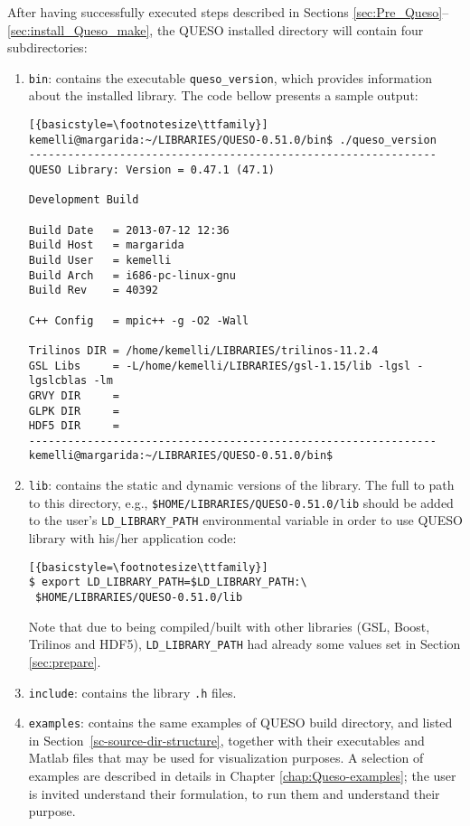 After having successfully executed steps described in Sections \ref{sec:Pre_Queso}--\ref{sec:install_Queso_make}, the QUESO installed directory will contain four subdirectories:
\begin{enumerate}
 \item \verb+bin+: contains the executable \verb+queso_version+, which provides information about the installed library. The code bellow presents a sample output:

\begin{lstlisting}[{basicstyle=\footnotesize\ttfamily}]
kemelli@margarida:~/LIBRARIES/QUESO-0.51.0/bin$ ./queso_version 
---------------------------------------------------------------
QUESO Library: Version = 0.47.1 (47.1)

Development Build

Build Date   = 2013-07-12 12:36
Build Host   = margarida
Build User   = kemelli
Build Arch   = i686-pc-linux-gnu
Build Rev    = 40392

C++ Config   = mpic++ -g -O2 -Wall

Trilinos DIR = /home/kemelli/LIBRARIES/trilinos-11.2.4
GSL Libs     = -L/home/kemelli/LIBRARIES/gsl-1.15/lib -lgsl -lgslcblas -lm
GRVY DIR     = 
GLPK DIR     = 
HDF5 DIR     = 
---------------------------------------------------------------
kemelli@margarida:~/LIBRARIES/QUESO-0.51.0/bin$ 
\end{lstlisting}

 \item \verb+lib+: contains the static and dynamic versions of the library. The full to path to this directory, e.g., \verb+$HOME/LIBRARIES/QUESO-0.51.0/lib+ should be added to the user's \verb+LD_LIBRARY_PATH+ environmental variable in order to use QUESO library with his/her application code:
\begin{lstlisting}[{basicstyle=\footnotesize\ttfamily}]
$ export LD_LIBRARY_PATH=$LD_LIBRARY_PATH:\
 $HOME/LIBRARIES/QUESO-0.51.0/lib
\end{lstlisting}


Note that due to \Queso{} being compiled/built with other libraries (GSL, Boost, Trilinos and HDF5), \verb+LD_LIBRARY_PATH+ had already some values set in Section \ref{sec:prepare}.


 \item \verb+include+: contains the library \verb+.h+ files.

 \item \verb+examples+: contains the same examples of QUESO build directory, and listed in Section~\ref{sc-source-dir-structure}, together with their executables and Matlab files that may be used for visualization purposes. A selection of examples are described in details in Chapter \ref{chap:Queso-examples}; the user is invited understand their formulation, to run them and understand their purpose. 


\end{enumerate}





